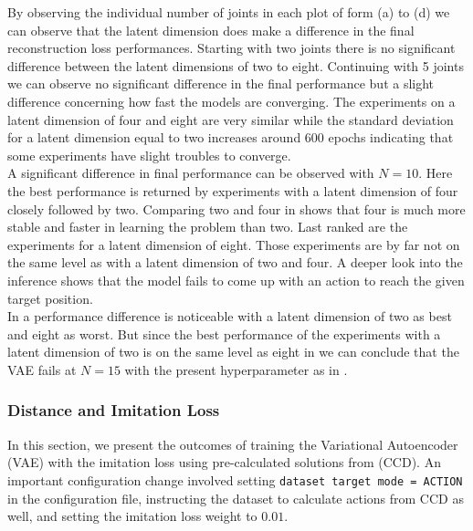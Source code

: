 By observing the individual number of joints in each plot of  form (a) to (d) we can observe that the latent dimension does make a difference in the final reconstruction loss performances. Starting with two joints there is no significant difference between the latent dimensions of two to eight. Continuing with 5 joints we can observe no significant difference in the final performance but a slight difference concerning how fast the models are converging. The experiments on a latent dimension of four and eight are very similar while the standard deviation for a latent dimension equal to two increases around 600 epochs indicating that some experiments have slight troubles to converge. \\
A significant difference in final performance can be observed with $N = 10$. Here the best performance is returned by experiments with a latent dimension of four closely followed by two. Comparing two and four in  shows that four is much more stable and faster in learning the problem than two. Last ranked are the experiments for a latent dimension of eight. Those experiments are by far not on the same level as with a latent dimension of two and four. A deeper look into the inference shows that the model fails to come up with an action to reach the given target position.\\
In  a performance difference is noticeable with a latent dimension of two as best and eight as worst. But since the best performance of the experiments with a latent dimension of two is on the same level as eight in  we can conclude that the VAE fails at $N = 15$ with the present hyperparameter as in .

\subsubsection{Distance and Imitation Loss}


In this section, we present the outcomes of training the Variational Autoencoder (VAE) with the imitation loss using pre-calculated solutions from  (CCD). An important configuration change involved setting \texttt{dataset target mode = ACTION} in the configuration file, instructing the dataset to calculate actions from CCD as well, and setting the imitation loss weight to $0.01$.


